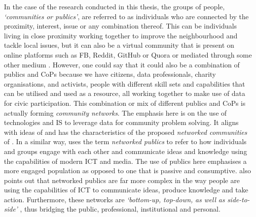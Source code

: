In the case of the research conducted in this thesis, the groups of people, \textit{`communities or publics'}, are referred to as individuals who are connected by the proximity, interest, issue or any combination thereof. This can be individuals living in close proximity working together to improve the neighbourhood and tackle local issues, but it can also be a virtual community \citep{rheingold_virtual_2000} that is present on online platforms such as FB, Reddit, GitHub or Quora or mediated through some other medium \citep{disalvo_neighborhood_2008}. However, one could say that it could also be a combination of publics and CoPs because we have citizens, data professionals, charity organisations, and activists, people with different skill sets and capabilities that can be utilised and used as a resource, all working together to make use of data for civic participation. This combination or mix of different publics and CoPs is actually forming \textit{community networks}. The emphasis here is on the use of technologies and IS to leverage data for community problem solving. It aligns with ideas of \citet{carroll_trajectory_2003} and has the characteristics of the proposed \textit{networked communities} of \citet[ch. 2]{clement_connecting_2012}. In a similar way, \citet{varnelis_networked_2008} uses the term \textit{networked publics} to refer to how individuals and groups engage with each other and communicate ideas and knowledge using the capabilities of modern ICT and media. The use of publics here emphasises a more engaged population as opposed to one that is passive and consumptive. \cite{varnelis_networked_2008} also points out that networked publics are far more complex in the way people are using the capabilities of ICT to communicate ideas, produce knowledge and take action. Furthermore, these networks are \textit{`bottom-up, top-down, as well as side-to-side'} \citep[p. 3]{varnelis_networked_2008}, thus bridging the public, professional, institutional and personal.

